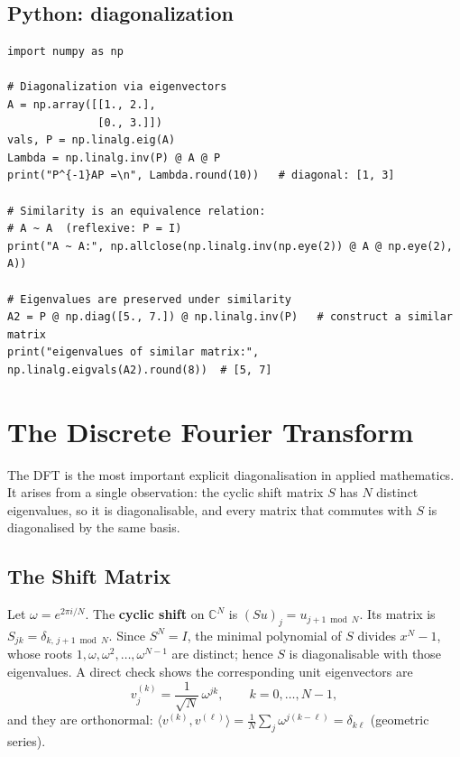 \documentclass[11pt]{article}
\theoremstyle{definition}
\theoremstyle{plain}
\begin{document}
\subsection{Python: diagonalization}
\begin{lstlisting}
import numpy as np

# Diagonalization via eigenvectors
A = np.array([[1., 2.],
              [0., 3.]])
vals, P = np.linalg.eig(A)
Lambda = np.linalg.inv(P) @ A @ P
print("P^{-1}AP =\n", Lambda.round(10))   # diagonal: [1, 3]

# Similarity is an equivalence relation:
# A ~ A  (reflexive: P = I)
print("A ~ A:", np.allclose(np.linalg.inv(np.eye(2)) @ A @ np.eye(2), A))

# Eigenvalues are preserved under similarity
A2 = P @ np.diag([5., 7.]) @ np.linalg.inv(P)   # construct a similar matrix
print("eigenvalues of similar matrix:", np.linalg.eigvals(A2).round(8))  # [5, 7]
\end{lstlisting}

\section{The Discrete Fourier Transform}

\noindent
The DFT is the most important explicit diagonalisation in applied
mathematics.  It arises from a single observation: the cyclic shift
matrix $S$ has $N$ distinct eigenvalues, so it is diagonalisable, and
every matrix that commutes with $S$ is diagonalised by the same basis.

\subsection{The Shift Matrix}

\noindent
Let $\omega = e^{2\pi i/N}$.  The \textbf{cyclic shift} on
$\mathbb{C}^N$ is $(Su)_j = u_{j+1\bmod N}$.  Its matrix is
$S_{jk}=\delta_{k,\,j+1\bmod N}$.  Since $S^N = I$, the minimal
polynomial of $S$ divides $x^N-1$, whose roots
$1,\omega,\omega^2,\ldots,\omega^{N-1}$ are distinct; hence $S$ is
diagonalisable with those eigenvalues.  A direct check shows the
corresponding unit eigenvectors are
\[
  v^{(k)}_j = \frac{1}{\sqrt{N}}\,\omega^{jk}, \qquad k=0,\ldots,N-1,
\]
and they are orthonormal: $\langle v^{(k)},v^{(\ell)}\rangle
= \frac{1}{N}\sum_j \omega^{j(k-\ell)} = \delta_{k\ell}$
(geometric series).
\end{document}
